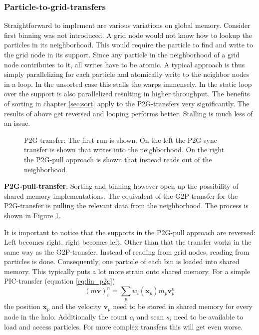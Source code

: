 \documentclass[m,times]{cgMA}
\begin{document}
\subsubsection{Particle-to-grid-transfers}\label{sec:p2g}
Straightforward to implement are various variations on global memory. Consider first binning was not introduced. A grid node would not know how to lookup the particles in its neighborhood. This would require the particle to find and write to the grid node in its support. Since any particle in the neighborhood of a grid node contributes to it, all writes have to be atomic. A typical approach is thus simply parallelizing for each particle and atomically write to the neighbor nodes in a loop. In the unsorted case this stalls the warps immensely. In \cite{Meyer2015} the static loop over the support is also parallelized resulting in higher throughput. The benefits of sorting in chapter \ref{sec:sort} apply to the P2G-transfers very significantly. The results of above get reversed and looping performs better. Stalling is much less of an issue.

\begin{figure}[t]
    \centering
  
  \caption{P2G-transfer: The first run is shown. On the left the P2G-sync-transfer is shown that writes into the neighborhood. On the right the P2G-pull approach is shown that instead reads out of the neighborhood.}
  \label{fig:p2g_transfer}
\end{figure}

\textbf{P2G-pull-transfer}: Sorting and binning however open up the possibility of shared memory implementations. The equivalent of the G2P-transfer for the P2G-transfer is pulling the relevant data from the neighborhood. The process is shown in Figure \ref{fig:p2g_transfer}.

It is important to notice that the supports in the P2G-pull approach are reversed: Left becomes right, right becomes left. Other than that the transfer works in the same way as the G2P-transfer. Instead of reading from grid nodes, reading from particles is done. Consequently, one particle of each bin is loaded into shared memory. This typically puts a lot more strain onto shared memory. For a simple PIC-transfer (equation \ref{eq:lin_p2g})
$$
(m\boldsymbol{v})_i^n = \sum_p w_{i}(\boldsymbol{x}_p)m_p\boldsymbol{v}^n_p
$$
the position $\boldsymbol{x}_p$ and the velocity $\boldsymbol{v}_p$ need to be stored in shared memory for every node in the halo. Additionally the count $c_i$ and scan $s_i$ need to be available to load and access particles. For more complex transfers this will get even worse.
\end{document}
